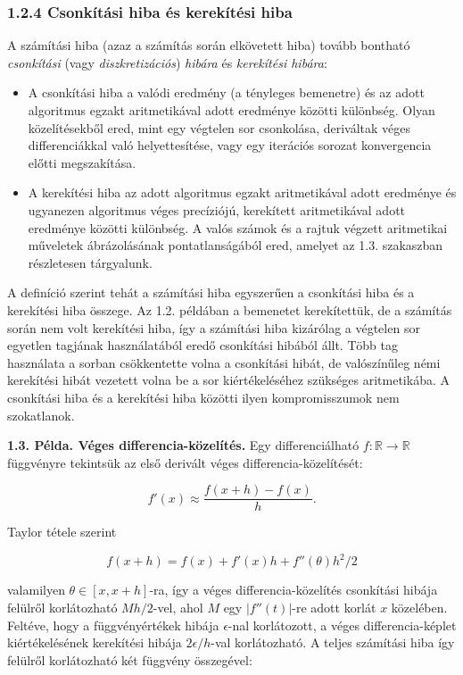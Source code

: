 \documentclass[
  magyar,
  11pt]{article}
\providecommand{\tightlist}{%
  \setlength{\itemsep}{0pt}\setlength{\parskip}{0pt}}
\begin{document}
\subsubsection{1.2.4 Csonkítási hiba és kerekítési
hiba}\label{csonkuxedtuxe1si-hiba-uxe9s-kerekuxedtuxe9si-hiba}

A számítási hiba (azaz a számítás során elkövetett hiba) tovább bontható
\emph{csonkítási} (vagy \emph{diszkretizációs}) \emph{hibára} és
\emph{kerekítési hibára}:

\begin{itemize}
\tightlist
\item
  A csonkítási hiba a valódi eredmény (a tényleges bemenetre) és az
  adott algoritmus egzakt aritmetikával adott eredménye közötti
  különbség. Olyan közelítésekből ered, mint egy végtelen sor
  csonkolása, deriváltak véges differenciákkal való helyettesítése, vagy
  egy iterációs sorozat konvergencia előtti megszakítása.
\item
  A kerekítési hiba az adott algoritmus egzakt aritmetikával adott
  eredménye és ugyanezen algoritmus véges precíziójú, kerekített
  aritmetikával adott eredménye közötti különbség. A valós számok és a
  rajtuk végzett aritmetikai műveletek ábrázolásának pontatlanságából
  ered, amelyet az 1.3. szakaszban részletesen tárgyalunk.
\end{itemize}

A definíció szerint tehát a számítási hiba egyszerűen a csonkítási hiba
és a kerekítési hiba összege. Az 1.2. példában a bemenetet kerekítettük,
de a számítás során nem volt kerekítési hiba, így a számítási hiba
kizárólag a végtelen sor egyetlen tagjának használatából eredő
csonkítási hibából állt. Több tag használata a sorban csökkentette volna
a csonkítási hibát, de valószínűleg némi kerekítési hibát vezetett volna
be a sor kiértékeléséhez szükséges aritmetikába. A csonkítási hiba és a
kerekítési hiba közötti ilyen kompromisszumok nem szokatlanok.

\textbf{1.3. Példa. Véges differencia-közelítés.} Egy differenciálható
\(f: \mathbb{R} \to \mathbb{R}\) függvényre tekintsük az első derivált
véges differencia-közelítését:

\[f'(x) \approx \frac{f(x+h) - f(x)}{h}.\]

Taylor tétele szerint

\[f(x+h) = f(x) + f'(x)h + f''(\theta)h^{2}/2\]

valamilyen \(\theta \in [x, x+h]\)-ra, így a véges differencia-közelítés
csonkítási hibája felülről korlátozható \(Mh/2\)-vel, ahol \(M\) egy
\(|f''(t)|\)-re adott korlát \(x\) közelében. Feltéve, hogy a
függvényértékek hibája \(\epsilon\)-nal korlátozott, a véges
differencia-képlet kiértékelésének kerekítési hibája \(2\epsilon/h\)-val
korlátozható. A teljes számítási hiba így felülről korlátozható két
függvény összegével:
\end{document}
